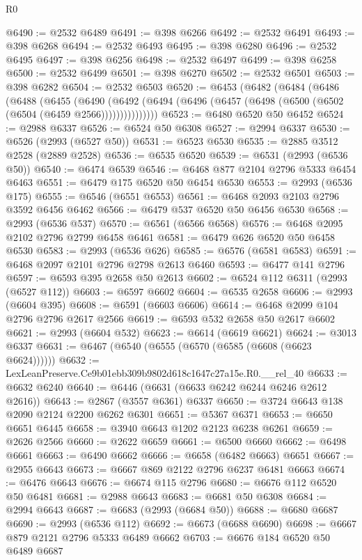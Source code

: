 \begin{lexlean}{R0}
\begin{coremodule}
@6490 := @2532 @6489
@6491 := @398 @6266
@6492 := @2532 @6491
@6493 := @398 @6268
@6494 := @2532 @6493
@6495 := @398 @6280
@6496 := @2532 @6495
@6497 := @398 @6256
@6498 := @2532 @6497
@6499 := @398 @6258
@6500 := @2532 @6499
@6501 := @398 @6270
@6502 := @2532 @6501
@6503 := @398 @6282
@6504 := @2532 @6503
@6520 := @6453
    (@6482
      (@6484
        (@6486
          (@6488
            (@6455
              (@6490
                (@6492 (@6494 (@6496 (@6457 (@6498 (@6500 (@6502 (@6504 (@6459 @2566)))))))))))))))
@6523 := @6480 @6520 @50 @6452
@6524 := @2988 @6337
@6526 := @6524 @50 @6308
@6527 := @2994 @6337
@6530 := @6526 (@2993 (@6527 @50))
@6531 := @6523 @6530
@6535 := @2885 @3512 @2528 (@2889 @2528)
@6536 := @6535 @6520
@6539 := @6531 (@2993 (@6536 @50))
@6540 := @6474 @6539
@6546 := @6468 @877 @2104 @2796 @5333 @6454 @6463
@6551 := @6479 @175 @6520 @50 @6454 @6530
@6553 := @2993 (@6536 @175)
@6555 := @6546 (@6551 @6553)
@6561 := @6468 @2093 @2103 @2796 @3592 @6456 @6462
@6566 := @6479 @537 @6520 @50 @6456 @6530
@6568 := @2993 (@6536 @537)
@6570 := @6561 (@6566 @6568)
@6576 := @6468 @2095 @2102 @2796 @2799 @6458 @6461
@6581 := @6479 @626 @6520 @50 @6458 @6530
@6583 := @2993 (@6536 @626)
@6585 := @6576 (@6581 @6583)
@6591 := @6468 @2097 @2101 @2796 @2798 @2613 @6460
@6593 := @6477 @141 @2796
@6597 := @6593 @395 @2658 @50 @2613
@6602 := @6524 @112 @6311 (@2993 (@6527 @112))
@6603 := @6597 @6602
@6604 := @6535 @2658
@6606 := @2993 (@6604 @395)
@6608 := @6591 (@6603 @6606)
@6614 := @6468 @2099 @104 @2796 @2796 @2617 @2566
@6619 := @6593 @532 @2658 @50 @2617 @6602
@6621 := @2993 (@6604 @532)
@6623 := @6614 (@6619 @6621)
@6624 := @3013 @6337
@6631 := @6467 (@6540 (@6555 (@6570 (@6585 (@6608 (@6623 @6624))))))
@6632 := LexLeanPreserve.Ce9b01ebb309b9802d618c1647c27a15e.R0.__rel_40
@6633 := @6632 @6240
@6640 := @6446 (@6631 (@6633 @6242 @6244 @6246 @2612 @2616))
@6643 := @2867 (@3557 @6361) @6337
@6650 := @3724 @6643 @138 @2090 @2124 @2200 @6262 @6301
@6651 := @5367 @6371
@6653 := @6650 @6651 @6445
@6658 := @3940 @6643 @1202 @2123 @6238 @6261
@6659 := @2626 @2566
@6660 := @2622 @6659
@6661 := @6500 @6660
@6662 := @6498 @6661
@6663 := @6490 @6662
@6666 := @6658 (@6482 @6663) @6651
@6667 := @2955 @6643
@6673 := @6667 @869 @2122 @2796 @6237 @6481 @6663
@6674 := @6476 @6643
@6676 := @6674 @115 @2796
@6680 := @6676 @112 @6520 @50 @6481
@6681 := @2988 @6643
@6683 := @6681 @50 @6308
@6684 := @2994 @6643
@6687 := @6683 (@2993 (@6684 @50))
@6688 := @6680 @6687
@6690 := @2993 (@6536 @112)
@6692 := @6673 (@6688 @6690)
@6698 := @6667 @879 @2121 @2796 @5333 @6489 @6662
@6703 := @6676 @184 @6520 @50 @6489 @6687

\end{coremodule}
\end{lexlean}
